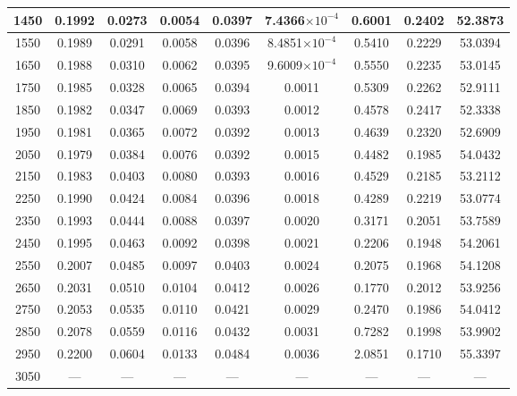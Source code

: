 \begin{table}[htbp]
\begin{tabular}{|c|c|c|c|c|c|c|c|c|}
    1450 & 0.1992 & 0.0273 & 0.0054 & 0.0397 & 7.4366$\times 10^{-4}$ & 0.6001 & 0.2402 & 52.3873 \\
    \hline
    1550 & 0.1989 & 0.0291 & 0.0058 & 0.0396 & 8.4851$\times 10^{-4}$ & 0.5410 & 0.2229 & 53.0394 \\
    1650 & 0.1988 & 0.0310 & 0.0062 & 0.0395 & 9.6009$\times 10^{-4}$ & 0.5550 & 0.2235 & 53.0145 \\
    1750 & 0.1985 & 0.0328 & 0.0065 & 0.0394 & 0.0011 & 0.5309 & 0.2262 & 52.9111 \\
    1850 & 0.1982 & 0.0347 & 0.0069 & 0.0393 & 0.0012 & 0.4578 & 0.2417 & 52.3338 \\
    1950 & 0.1981 & 0.0365 & 0.0072 & 0.0392 & 0.0013 & 0.4639 & 0.2320 & 52.6909 \\
    \hline
    2050 & 0.1979 & 0.0384 & 0.0076 & 0.0392 & 0.0015 & 0.4482 & 0.1985 & 54.0432 \\
    2150 & 0.1983 & 0.0403 & 0.0080 & 0.0393 & 0.0016 & 0.4529 & 0.2185 & 53.2112 \\
    2250 & 0.1990 & 0.0424 & 0.0084 & 0.0396 & 0.0018 & 0.4289 & 0.2219 & 53.0774 \\
    2350 & 0.1993 & 0.0444 & 0.0088 & 0.0397 & 0.0020 & 0.3171 & 0.2051 & 53.7589 \\
    2450 & 0.1995 & 0.0463 & 0.0092 & 0.0398 & 0.0021 & 0.2206 & 0.1948 & 54.2061 \\
    \hline
    2550 & 0.2007 & 0.0485 & 0.0097 & 0.0403 & 0.0024 & 0.2075 & 0.1968 & 54.1208 \\
    2650 & 0.2031 & 0.0510 & 0.0104 & 0.0412 & 0.0026 & 0.1770 & 0.2012 & 53.9256 \\
    2750 & 0.2053 & 0.0535 & 0.0110 & 0.0421 & 0.0029 & 0.2470 & 0.1986 & 54.0412 \\
    2850 & 0.2078 & 0.0559 & 0.0116 & 0.0432 & 0.0031 & 0.7282 & 0.1998 & 53.9902 \\
    2950 & 0.2200 & 0.0604 & 0.0133 & 0.0484 & 0.0036 & 2.0851 & 0.1710 & 55.3397 \\
    \hline
    3050 & --- & --- & --- & --- & --- & --- & --- & --- \\
    \hline
  \end{tabular}
\end{table}

